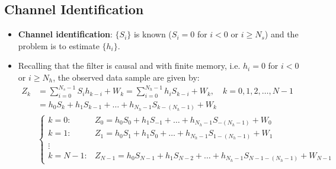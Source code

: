\subsection{Channel Identification}
\begin{itemize}
    \item \textbf{Channel identification}: \(\{S_i\}\) is known (\(S_i=0\) for \(i<0\) or \(i\geq N_s\)) and the problem is to estimate \(\{h_i\}\).
    \item Recalling that the filter is causal and with finite memory, i.e. \(h_i=0\) for \(i<0\) or \(i\geq N_h\), the observed data sample are given by:
    \begin{align*}
Z_k &= \sum_{i=0}^{N_s-1} S_i h_{k-i} + W_k = \sum_{i=0}^{N_h-1} h_i S_{k-i} + W_k, \quad k=0, 1, 2, \dots, N-1 \\[8pt]
&= h_0 S_k + h_1 S_{k-1} + \dots + h_{N_h-1} S_{k-(N_h-1)} + W_k \\[15pt]
&\begin{cases}
k=0: & Z_0 = h_0 S_0 + h_1 S_{-1} + \dots + h_{N_h-1} S_{-(N_h-1)} + W_0 \\
k=1: & Z_1 = h_0 S_1 + h_1 S_0 + \dots + h_{N_h-1} S_{1-(N_h-1)} + W_1 \\
\vdots \\
k=N-1: & Z_{N-1} = h_0 S_{N-1} + h_1 S_{N-2} + \dots + h_{N_h-1} S_{N-1-(N_h-1)} + W_{N-1}
\end{cases}
\end{align*}



\end{itemize}
